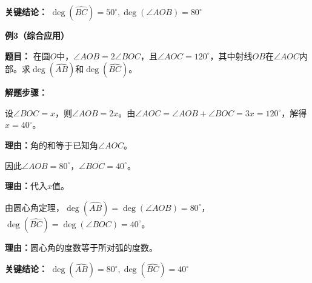\begin{examplebox}
	\textbf{\textcolor{CExample}{关键结论：}}
	\textbf{$\deg(\widehat{BC}) = 50^{\circ}, \deg(\angle AOB) = 80^{\circ}$}

	\medskip
	\textbf{\textcolor{CExample}{例3（综合应用）}}

	\textbf{\textcolor{CExample}{题目：}}
	在圆$O$中，$\angle AOB = 2\angle BOC$，且$\angle AOC = 120^{\circ}$，其中射线$OB$在$\angle AOC$内部。求$\deg(\widehat{AB})$和$\deg(\widehat{BC})$。

	\textbf{\textcolor{CExample}{解题步骤：}}
	\begin{description}[style=nextline, leftmargin=2.8em, labelsep=0.5em, itemsep=0.45em]
		\item[\textbf{第一步（列方程）：}] 设$\angle BOC = x$，则$\angle AOB = 2x$。由$\angle AOC = \angle AOB + \angle BOC = 3x = 120^{\circ}$，解得$x = 40^{\circ}$。
			\par\textbf{理由：}角的和等于已知角$\angle AOC$。
		\item[\textbf{第二步（计算各角）：}] 因此$\angle AOB = 80^{\circ}$，$\angle BOC = 40^{\circ}$。
			\par\textbf{理由：}代入$x$值。
		\item[\textbf{第三步（求弧的度数）：}] 由圆心角定理，$\deg(\widehat{AB}) = \deg(\angle AOB) = 80^{\circ}$，$\deg(\widehat{BC}) = \deg(\angle BOC) = 40^{\circ}$。
			\par\textbf{理由：}圆心角的度数等于所对弧的度数。
	\end{description}

	\textbf{\textcolor{CExample}{关键结论：}}
	\textbf{$\deg(\widehat{AB}) = 80^{\circ}, \deg(\widehat{BC}) = 40^{\circ}$}
\end{examplebox}
